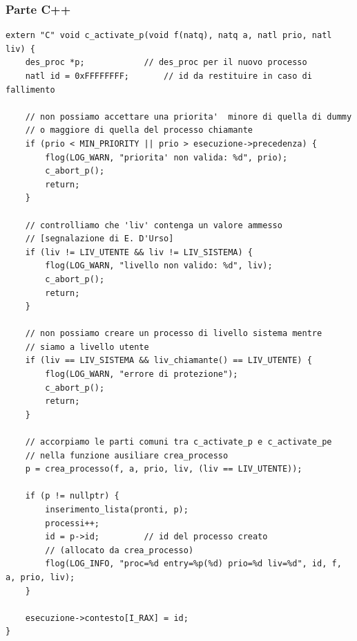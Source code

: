 \documentclass[11pt]{report}
\theoremstyle{definition}
\begin{document}
\subsubsection{Parte C++}
\small 
\begin{verbatim}
extern "C" void c_activate_p(void f(natq), natq a, natl prio, natl liv) {
    des_proc *p;			// des_proc per il nuovo processo
    natl id = 0xFFFFFFFF;		// id da restituire in caso di fallimento
	
    // non possiamo accettare una priorita'  minore di quella di dummy
    // o maggiore di quella del processo chiamante
    if (prio < MIN_PRIORITY || prio > esecuzione->precedenza) {
        flog(LOG_WARN, "priorita' non valida: %d", prio);
        c_abort_p();
        return;
    }
	
    // controlliamo che 'liv' contenga un valore ammesso
    // [segnalazione di E. D'Urso]
    if (liv != LIV_UTENTE && liv != LIV_SISTEMA) {
        flog(LOG_WARN, "livello non valido: %d", liv);
        c_abort_p();
        return;
    }
	
    // non possiamo creare un processo di livello sistema mentre
    // siamo a livello utente
    if (liv == LIV_SISTEMA && liv_chiamante() == LIV_UTENTE) {
        flog(LOG_WARN, "errore di protezione");
        c_abort_p();
        return;
    }
	
    // accorpiamo le parti comuni tra c_activate_p e c_activate_pe
    // nella funzione ausiliare crea_processo
    p = crea_processo(f, a, prio, liv, (liv == LIV_UTENTE));
	
    if (p != nullptr) {
        inserimento_lista(pronti, p);
        processi++;
        id = p->id;			// id del processo creato
        // (allocato da crea_processo)
        flog(LOG_INFO, "proc=%d entry=%p(%d) prio=%d liv=%d", id, f, a, prio, liv);
    }
	
    esecuzione->contesto[I_RAX] = id;
}
\end{verbatim}
\normalsize 
\end{document}
